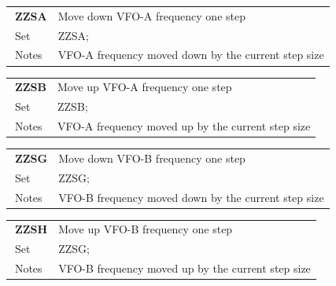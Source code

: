 \documentclass[12pt]{book}
\begin{document}
\begin{center}
\begin{tabular}{|p{2cm}|p{11cm}|}
\toprule
$\phantom{\Big|}$\textbf{\large ZZSA} & Move down VFO-A frequency one step \\\cline{1-2}
$\phantom{\Big|}${\large Set} & {ZZSA;} \\\hline
$\phantom{\Big|}${\large Notes} & \multicolumn{1}{|p{11cm}|}{VFO-A frequency moved down by the current step size} \\
\bottomrule
\end{tabular}
\end{center}

\begin{center}
\begin{tabular}{|p{2cm}|p{11cm}|}
\toprule
$\phantom{\Big|}$\textbf{\large ZZSB} & Move up VFO-A frequency one step \\\cline{1-2}
$\phantom{\Big|}${\large Set} & {ZZSB;} \\\hline
$\phantom{\Big|}${\large Notes} & \multicolumn{1}{|p{11cm}|}{VFO-A frequency moved up by the current step size} \\
\bottomrule
\end{tabular}
\end{center}

\begin{center}
\begin{tabular}{|p{2cm}|p{11cm}|}
\toprule
$\phantom{\Big|}$\textbf{\large ZZSG} & Move down VFO-B frequency one step \\\cline{1-2}
$\phantom{\Big|}${\large Set} & {ZZSG;} \\\hline
$\phantom{\Big|}${\large Notes} & \multicolumn{1}{|p{11cm}|}{VFO-B frequency moved down by the current step size} \\
\bottomrule
\end{tabular}
\end{center}

\begin{center}
\begin{tabular}{|p{2cm}|p{11cm}|}
\toprule
$\phantom{\Big|}$\textbf{\large ZZSH} & Move up VFO-B frequency one step \\\cline{1-2}
$\phantom{\Big|}${\large Set} & {ZZSG;} \\\hline
$\phantom{\Big|}${\large Notes} & \multicolumn{1}{|p{11cm}|}{VFO-B frequency moved up by the current step size} \\
\bottomrule
\end{tabular}
\end{center}
\end{document}
